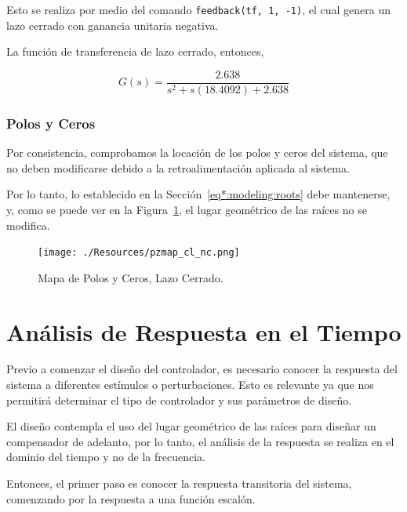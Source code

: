 \documentclass[12pt,a4paper]{article}
\begin{document}
        Esto se realiza por medio del comando \verb|feedback(tf, 1, -1)|, el cual genera un lazo cerrado con ganancia 
        unitaria negativa. 

        La función de transferencia de lazo cerrado, entonces,

        \begin{equation}
          G\left(s\right) = \frac{2.638}{s^{2} + s\left(18.4092\right) + 2.638}
          \label{eq:model:closedLoopTf}
        \end{equation}

      \subsubsection{Polos y Ceros}
        	
        Por consistencia, comprobamos la locación de los polos y ceros del sistema, que no deben modificarse
        debido a la retroalimentación aplicada al sistema.

        Por lo tanto, lo establecido en la Sección~\ref{eq*:modeling:roots} debe mantenerse, y, como se puede ver en la 
        Figura~\ref{fig:modeling:pzmap_closed}, el lugar geométrico de las raíces no se modifica. 

        \begin{figure}
          \centering
          \texttt{[image: ./Resources/pzmap\_cl\_nc.png]}
          \caption{Mapa de Polos y Ceros, Lazo Cerrado.}
          \label{fig:modeling:pzmap_closed}
        \end{figure}

    \pagebreak

    \section{Análisis de Respuesta en el Tiempo}

      Previo a comenzar el diseño del controlador, es necesario conocer la respuesta del sistema a diferentes 
      estímulos o perturbaciones. Esto es relevante ya que nos permitirá determinar el tipo de controlador 
      y sus parámetros de diseño. 

      El diseño contempla el uso del lugar geométrico de las raíces para diseñar un compensador de adelanto, por lo 
      tanto, el análisis de la respuesta se realiza en el dominio del tiempo y no de la frecuencia. 

      Entonces, el primer paso es conocer la respuesta transitoria del sistema, comenzando por la respuesta 
      a una función escalón. 
\end{document}
